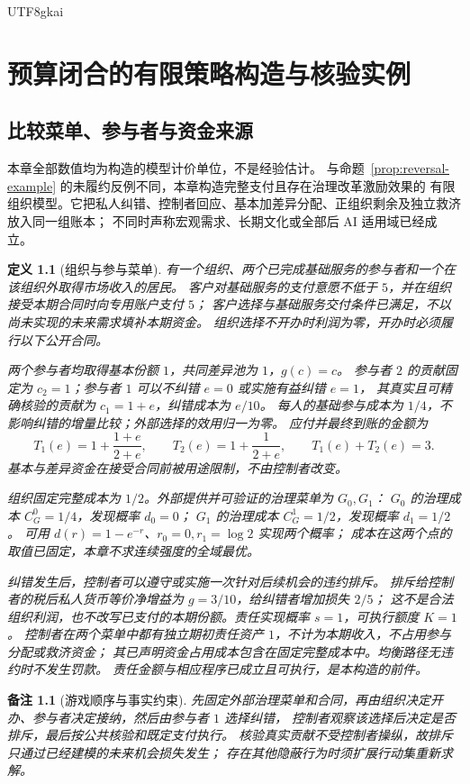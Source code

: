 \documentclass[12pt,a4paper,openany]{report}
\newtheorem{definition}{定义}[chapter]
\newtheorem{remark}{备注}[chapter]
\begin{document}
\begin{CJK*}{UTF8}{gkai}
\chapter{预算闭合的有限策略构造与核验实例}
\label{chap:example}

\section{比较菜单、参与者与资金来源}

本章全部数值均为构造的模型计价单位，不是经验估计。
与命题~\ref{prop:reversal-example} 的未履约反例不同，本章构造完整支付且存在治理改革激励效果的
有限组织模型。它把私人纠错、控制者回应、基本加差异分配、正组织剩余及独立救济放入同一组账本；
不同时声称宏观需求、长期文化或全部后 AI 适用域已经成立。

\begin{definition}[组织与参与菜单]
\label{def:example-game}
有一个组织、两个已完成基础服务的参与者和一个在该组织外取得市场收入的居民。
客户对基础服务的支付意愿不低于 $5$，并在组织接受本期合同时向专用账户支付 $5$；
客户选择与基础服务交付条件已满足，不以尚未实现的未来需求填补本期资金。
组织选择不开办时利润为零，开办时必须履行以下公开合同。

两个参与者均取得基本份额 $1$，共同差异池为 $1$，$g(c)=c$。
参与者 $2$ 的贡献固定为 $c_2=1$；参与者 $1$ 可以不纠错 $e=0$ 或实施有益纠错 $e=1$，
其真实且可精确核验的贡献为 $c_1=1+e$，纠错成本为 $e/10$。
每人的基础参与成本为 $1/4$，不影响纠错的增量比较；外部选择的效用归一为零。
应付并最终到账的金额为
\[
 T_1(e)=1+\frac{1+e}{2+e},\qquad
 T_2(e)=1+\frac1{2+e},\qquad T_1(e)+T_2(e)=3.
\]
基本与差异资金在接受合同前被用途限制，不由控制者改变。

组织固定完整成本为 $1/2$。外部提供并可验证的治理菜单为 $G_0,G_1$：
$G_0$ 的治理成本 $C_G^0=1/4$，发现概率 $d_0=0$；
$G_1$ 的治理成本 $C_G^1=1/2$，发现概率 $d_1=1/2$。
可用 $d(r)=1-e^{-r}$、$r_0=0,r_1=\log2$ 实现两个概率；
成本在这两个点的取值已固定，本章不求连续强度的全域最优。

纠错发生后，控制者可以遵守或实施一次针对后续机会的违约排斥。
排斥给控制者的税后私人货币等价净增益为 $g=3/10$，给纠错者增加损失 $2/5$；
这不是合法组织利润，也不改写已支付的本期份额。责任实现概率 $s=1$，可执行额度 $K=1$。
控制者在两个菜单中都有独立期初责任资产 $1$，不计为本期收入，不占用参与分配或救济资金；
其已声明资金占用成本包含在固定完整成本中。均衡路径无违约时不发生罚款。
责任金额与相应程序已成立且可执行，是本构造的前件。
\end{definition}

\begin{remark}[游戏顺序与事实约束]
先固定外部治理菜单和合同，再由组织决定开办、参与者决定接纳，然后由参与者 $1$ 选择纠错，
控制者观察该选择后决定是否排斥，最后按公共核验和既定支付执行。
核验真实贡献不受控制者操纵，故排斥只通过已经建模的未来机会损失发生；
存在其他隐蔽行为时须扩展行动集重新求解。
\end{remark}


\end{CJK*}
\end{document}

